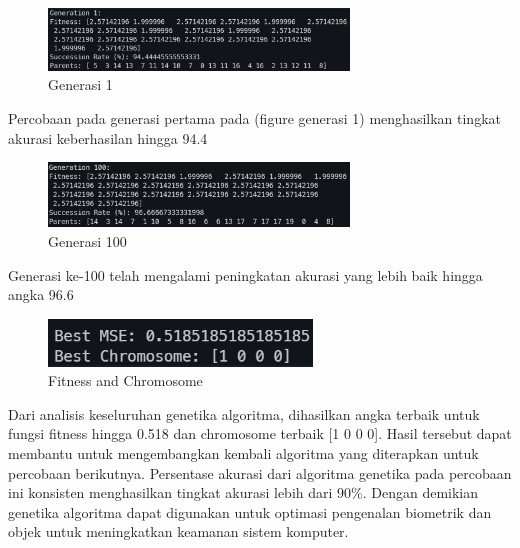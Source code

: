 \documentclass[conference]{IEEEtran}
\begin{document}
\begin{figure}[htp]
    \centering
    \includegraphics[width=8cm]{images/Generation 1.png}
    \caption{Generasi 1}
    \label{fig:Generation1}
\end{figure}

Percobaan pada generasi pertama pada (figure generasi 1) menghasilkan tingkat akurasi keberhasilan hingga 94.4%

\begin{figure}[htp]
    \centering
    \includegraphics[width=8cm]{images/Generation 100.png}
    \caption{Generasi 100}
    \label{fig:Generation100}
\end{figure}

Generasi ke-100 telah mengalami peningkatan akurasi yang lebih baik hingga angka 96.6%

\begin{figure}[htp]
    \centering
    \includegraphics[width=7cm]{images/MSE.png}
    \caption{Fitness and Chromosome}
    \label{fig:MSE}
\end{figure}

Dari analisis keseluruhan genetika algoritma, dihasilkan angka terbaik untuk fungsi fitness hingga 0.518 dan chromosome terbaik [1 0 0 0]. Hasil tersebut dapat membantu untuk mengembangkan kembali algoritma yang diterapkan untuk percobaan berikutnya. Persentase akurasi dari algoritma genetika pada percobaan ini konsisten menghasilkan tingkat akurasi lebih dari 90\%. Dengan demikian genetika algoritma dapat digunakan untuk optimasi pengenalan biometrik dan objek untuk meningkatkan keamanan sistem komputer.
\end{document}
